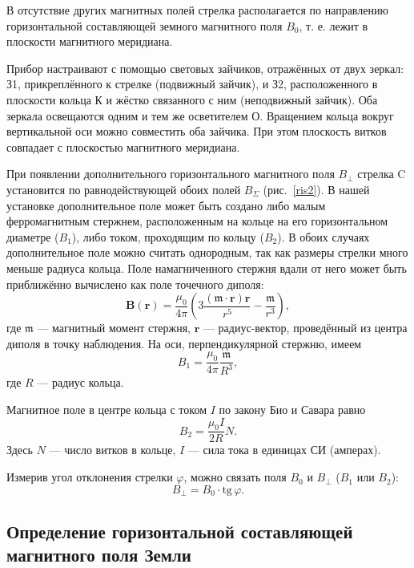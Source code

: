 \documentclass[a4paper, 12pt]{article}
\begin{document}
В отсутствие других магнитных полей стрелка располагается по направлению горизонтальной составляющей земного магнитного поля $B_0$, т. е. лежит в плоскости магнитного меридиана.

Прибор настраивают с помощью световых зайчиков, отражённых от двух зеркал: З1, прикреплённого к стрелке (подвижный зайчик), и З2, расположенного в плоскости кольца К и жёстко связанного с ним (неподвижный зайчик). Оба зеркала освещаются одним и тем же осветителем О. Вращением кольца вокруг вертикальной оси можно совместить оба зайчика. При этом плоскость витков совпадает с плоскостью магнитного меридиана.

При появлении дополнительного горизонтального магнитного поля $B_\perp$ стрелка C установится по равнодействующей обоих полей $B_\Sigma$ (рис.~\ref{ris2}). В нашей установке дополнительное поле может быть создано либо малым ферромагнитным стержнем, расположенным на кольце на его горизонтальном диаметре ($B_1$), либо током, проходящим по кольцу ($B_2$). В обоих случаях дополнительное поле можно считать однородным, так как размеры стрелки много меньше радиуса кольца. Поле намагниченного стержня вдали от него может быть приближённо вычислено как поле точечного диполя:
\begin{equation}\label{dipolfield}
\mathbf{B(r)} = \frac{\mu_0}{4\pi}\left(3\frac{(\mathbf{\mathfrak{m} \cdot r})\mathbf{r}}{r^5} - \frac{\mathbf{\mathfrak{m}}}{r^3}\right),
\end{equation}
где $\mathbf{\mathfrak{m}}$ --- магнитный момент стержня, $\mathbf{r}$ --- радиус-вектор, проведённый из центра диполя в точку наблюдения. На оси, перпендикулярной стержню, имеем
\begin{equation}\label{axisfield}
B_1 = \frac{\mu_0}{4\pi}\frac{\mathfrak{m}}{R^3},
\end{equation}
где $R$ --- радиус кольца.

Магнитное поле в центре кольца с током $I$ по закону Био и Савара равно
\begin{equation}\label{BioSavara}
B_2 = \frac{\mu_0I}{2R}N.
\end{equation}
Здесь $N$ --- число витков в кольце, $I$ --- сила тока в единицах СИ (амперах).

Измерив угол отклонения стрелки $\varphi$, можно связать поля $B_0$ и $B_\perp$ ($B_1$ или $B_2$):
\begin{equation}\label{arrowangle}
B_\perp = B_0 \cdot \mathrm{tg}\,\varphi.
\end{equation}

\subsection{Определение горизонтальной составляющей магнитного поля Земли}
\end{document}

